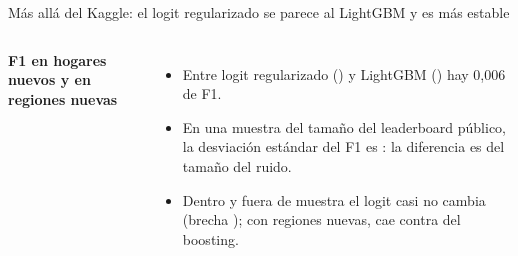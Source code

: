 \begin{frame}{Más allá del Kaggle: el logit regularizado se parece al LightGBM y es más estable}
  \begin{columns}[T]
    \centering\small\textbf{F1 en hogares nuevos y en regiones nuevas}\\[2mm]
    \footnotesize
    \resizebox{\linewidth}{!}{}\\[2mm]
    \small
    \begin{itemize}\setlength{\itemsep}{3pt}
      \item Entre logit regularizado (\nFoneLogitRob) y LightGBM (\nFoneLGBM) hay 0,006 de F1.
      \item En una muestra del tamaño del leaderboard público, la desviación estándar del F1 es \nPublicSD{}: la diferencia es del tamaño del ruido.
      \item Dentro y fuera de muestra el logit casi no cambia (brecha \nGapLogit); con regiones nuevas, cae \nDropLogitRegions{} contra \nDropLGBMRegions{} del boosting.
    \end{itemize}
  \end{columns}
\end{frame}

